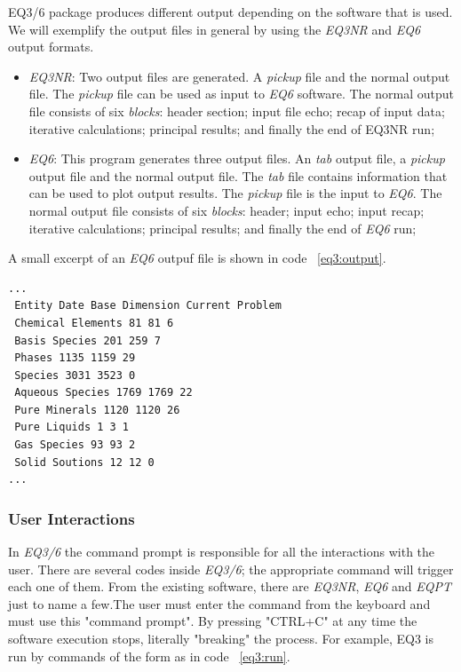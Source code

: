 \documentclass[ppgc,mestrado,english]{iiufrgs}
\begin{document}
EQ3/6 package produces different output depending on the software that is used. We will exemplify the output files in general by using the \emph{EQ3NR} and \emph{EQ6} output formats. 
\begin{itemize}
\item \emph{EQ3NR}: Two output files are generated. A \emph{pickup} file and the normal output file. The \emph{pickup} file can be used as input to \emph{EQ6} software. The normal output file consists of six \emph{blocks}: header section; input file echo; recap of input data; iterative calculations; principal results; and finally the end of EQ3NR run;
\item \emph{EQ6}: This program generates three output files. An \emph{tab} output file, a \emph{pickup} output file and the normal output file. The \emph{tab} file contains information that can be used to plot output results. The \emph{pickup} file is the input to \emph{EQ6}. The normal output file consists of six \emph{blocks}: header; input echo; input recap; iterative calculations; principal results; and finally the end of \emph{EQ6} run;
\end{itemize}

A small excerpt of an \emph{EQ6} outpuf file is shown in code ~\ref{eq3:output}.

\begin{lstlisting}[frame=single, caption=Excerpt of \emph{EQ6} output file, label=eq3:output]
...
 Entity Date Base Dimension Current Problem
 Chemical Elements 81 81 6
 Basis Species 201 259 7
 Phases 1135 1159 29
 Species 3031 3523 0
 Aqueous Species 1769 1769 22
 Pure Minerals 1120 1120 26
 Pure Liquids 1 3 1
 Gas Species 93 93 2
 Solid Soutions 12 12 0
...
\end{lstlisting}

\subsubsection{User Interactions}
In \emph{EQ3/6} the command prompt is responsible for all the interactions with the user. There are several codes inside \emph{EQ3/6}; the appropriate command will trigger each one of them. From the existing software, there are \emph{EQ3NR}, \emph{EQ6} and \emph{EQPT} just to name a few.The user must enter the command from the keyboard and must use this "command prompt". By pressing "CTRL+C" at any time the software execution stops, literally "breaking" the process. For example, EQ3 is run by commands of the form as in code ~\ref{eq3:run}.
\end{document}
